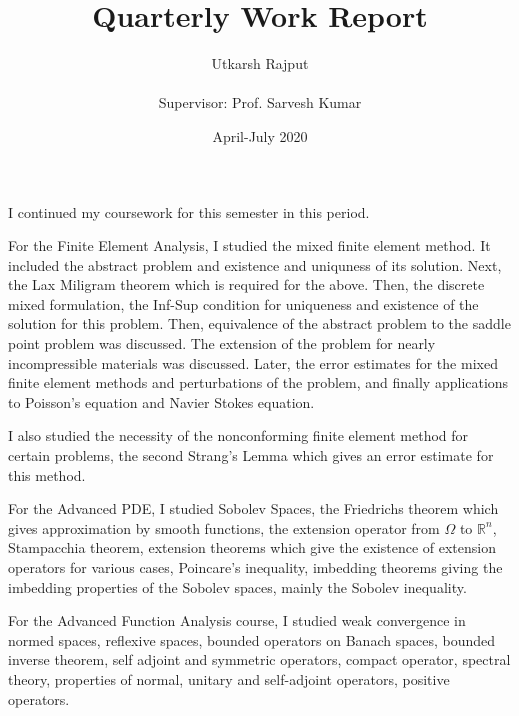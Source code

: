 \documentclass[12pt]{article}
\title{Quarterly Work Report}
\date{April-July 2020}
\author{Utkarsh Rajput \\\\{Supervisor: Prof. Sarvesh Kumar}}
\begin{document}
	\maketitle
	I continued my coursework for this semester in this period.
	
	For the Finite Element Analysis, I studied the mixed finite element method. It included the abstract problem and existence and uniquness of its solution. Next, the Lax Miligram theorem which is required for the above. Then, the discrete mixed formulation, the Inf-Sup condition for uniqueness and existence of the solution for this problem. Then, equivalence of the abstract problem to the saddle point problem was discussed. The extension of the problem for nearly incompressible materials was discussed. Later, the error estimates for the mixed finite element methods and perturbations of the problem, and finally applications to Poisson's equation and Navier Stokes equation.
	
	I also studied the necessity of the nonconforming finite element method for certain problems, the second Strang's Lemma which gives an error estimate for this method.
	
	For the Advanced PDE, I studied Sobolev Spaces, the Friedrichs theorem which gives approximation by smooth functions, the extension operator from $\Omega$ to $\mathbb{R}^n$, Stampacchia theorem, extension theorems which give the existence of extension operators for various cases, Poincare's inequality, imbedding theorems giving the imbedding properties of the Sobolev spaces, mainly the Sobolev inequality.
	
	For the Advanced Function Analysis course, I studied weak convergence in normed spaces, reflexive spaces, bounded operators on Banach spaces, bounded inverse theorem, self adjoint and symmetric operators, compact operator, spectral theory, properties of normal, unitary and self-adjoint operators, positive operators.
\end{document}
